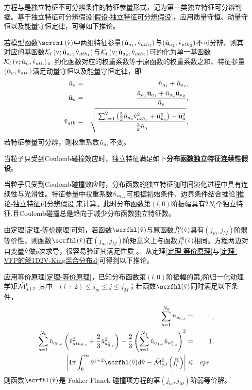 方程与是独立特征不可分辨条件的特征参量形式，记为第一类独立特征可分辨判据。基于独立特征可分辨假设\ref{假设-独立特征可分辨假设}，应用质量守恒、动量守恒以及能量守恒定律，可得如下推论。
\begin{corollary} \label{推论-独立特征可分辨假设}
    若模型函数$\scrfhl \left(\rmvh \right)$中两组特征参量$\left(\hat{\mathbf{u}}_{a_1},\hat{\mathrm{v}}_{{ath}_1} \right)$与$\left(\hat{\mathbf{u}}_{a_2},\hat{\mathrm{v}}_{{ath}_2} \right)$不可分辨，则其对应的基函数$\mathcal{K}_l \left(\mathrm{v};\hat{\mathbf{u}}_{a_1},\hat{\mathrm{v}}_{{ath}_1} \right)$与$\mathcal{K}_l \left(\mathrm{v};\hat{\mathbf{u}}_{a_2},\hat{\mathrm{v}}_{{ath}_2} \right)$可约化为单一基函数$\mathcal{K}_l \left(\mathrm{v};\hat{\mathbf{u}}_a,\hat{\mathrm{v}}_{ath} \right)$。约化函数对应的权重系数等于原函数的权重系数之和、特征参量$\left(\hat{\mathbf{u}}_a,\hat{\mathrm{v}}_{ath} \right)$满足动量守恒以及能量守恒定律，即
    \begin{eqnarray}
          \hat{n}_a & = & \hat{n}_{a_1} + \hat{n}_{a_2},
          \\
          \hat{\mathbf{u}}_a & = & \frac{\hat{n}_{a_1} \hat{\mathbf{u}}_{a_1} + \hat{n}_{a_2} \hat{\mathbf{u}}_{a_2}}{\hat{n}_a} ,
          \\
          \hat{\mathrm{v}}_{ath} & = & \sqrt{\frac{\sum_{s=1}^2 \left(\frac{3}{2} \hat{n}_{a_s} \hat{\mathrm{v}}_{{ath}_s}^2 +  \hat{\mathbf{u}}_{a_s}^2 \right) - \hat{\mathbf{u}}_a^2}{\frac{3}{2} \hat{n}_a}},
    \end{eqnarray}
    若特征参量可分辨，则权重系数$\hat{n}_{a_s}$不变。
\end{corollary}

当粒子只受到Coulomb碰撞效应时，独立特征满足如下\textbf{分布函数独立特征连续性假设}。
\begin{theorem} \label{假设-分布函数独立特征连续性假设}
      当粒子只受到Coulomb碰撞效应时，分布函数的独立特征随时间演化过程中具有连续性与光滑性。特征参量中权重系数$\hat{n}_{a_{l,s}}$可根据初始条件、边界条件结合推论\ref{推论-独立特征可分辨假设}来计算。此时分布函数第$(l,0)$阶振幅具有$2N_l$个独立特征,且Coulomb碰撞总是趋向于减少分布函数独立特征数。
\end{theorem}

由定理\ref{定理-等价原理}可知，若函数$\scrfhl (\rmvh)$与原函数$\hat{f}_l^0(\hat{\mathrm{v}})$具有$(j_m,j_M)$阶弱等价性，则函数$\scrfhl (\rmvh)$在$(j_m,j_M)$阶矩意义上与函数$\hat{f}_l^0(\hat{\mathrm{v}})$相同。方程两边对自变量$\hat{\mathrm{v}}$做$p$次求导，很容易验证其满足性质-。
从定理\ref{定理-等价原理}与\ref{定理-VFP的解1D2V-King混合分布sl}可得到以下推论。
\begin{corollary} \label{推论-等价原理-Khlsl}
    应用等价原理\ref{定理-等价原理}，已知分布函数第$(l,0)$阶振幅的第$j$阶归一化动理学矩${\hat{\mathcal{M}}}{_{j,l}^0}$，其中$ - (l+2) \le j_m \le j \le j_M$；若函数$\scrfhl (\rmvh)$同时满足以下条件，
    \begin{eqnarray}
      \sum_{s=1}^{N_0} \nhaso &=& 1 ~, \label{scrfl0slnh}
      \\
      \sum_{s=1}^{N_0} \nhaso \left(\vhathso^2 + \frac{2}{3} \uhazso^2 \right) - \frac{2}{3}  \left(\sum_{s=1}^{N_1} \nhasI \uhazsI \right)^2  &=& 1 , \label{scrfl0slKh}
      \\
     \left |4 \pi  \int_0^\infty \rmvh^{j+2} \scrfhl (\rmvh) \rmd \rmvh - \calMhjlo \left(\fhl \right) \right |  & \le & eps ~ . \label{scrfl0slj}
    \end{eqnarray}
则函数$\scrfhl (\rmvh)$是 Fokker-Planck 碰撞项方程的第$(j_m,j_M)$阶弱等价解。
\end{corollary}

